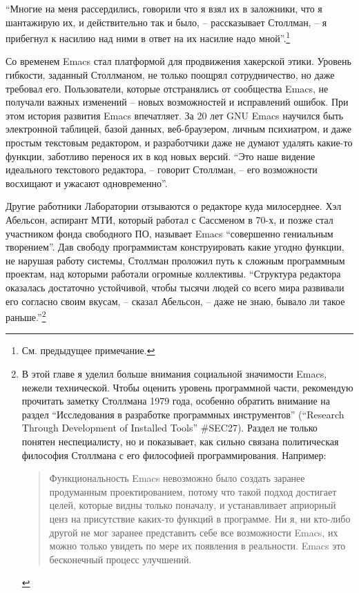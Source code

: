 \enquote{Многие на меня рассердились, говорили что я взял их в заложники, что я шантажирую их, и действительно так и было, -- рассказывает Столлман, -- я прибегнул к насилию над ними в ответ на их насилие надо мной}.\footnote{См. предыдущее примечание.}

Со временем Emacs стал платформой для продвижения хакерской этики. Уровень гибкости, заданный Столлманом, не только поощрял сотрудничество, но даже требовал его. Пользователи, которые отстранялись от сообщества Emacs, не получали важных изменений -- новых возможностей и исправлений ошибок. При этом история развития Emacs впечатляет. За 20 лет GNU Emacs научился быть электронной таблицей, базой данных, веб-браузером, личным психиатром, и даже простым текстовым редактором, и разработчики даже не думают удалять какие-то функции, заботливо перенося их в код новых версий. \enquote{Это наше видение идеального текстового редактора, -- говорит Столлман, -- его возможности восхищают и ужасают одновременно}.

Другие работники Лаборатории отзываются о редакторе куда милосерднее. Хэл Абельсон, аспирант МТИ, который работал с Сассменом в 70-х, и позже стал участником фонда свободного ПО, называет Emacs \enquote{совершенно гениальным творением}. Дав свободу программистам конструировать какие угодно функции, не нарушая работу системы, Столлман проложил путь к сложным программным проектам, над которыми работали огромные коллективы. \enquote{Структура редактора оказалась достаточно устойчивой, чтобы тысячи людей со всего мира развивали его согласно своим вкусам, -- сказал Абельсон, -- даже не знаю, бывало ли такое раньше.}\footnote{В этой главе я уделил больше внимания социальной значимости Emacs, нежели технической. Чтобы оценить уровень программной части, рекомендую прочитать заметку Столлмана 1979 года, особенно обратить внимание на раздел \enquote{Исследования в разработке программных инструментов} (\enquote{Research Through Development of Installed Tools} \#SEC27). Раздел не только понятен неспециалисту, но и показывает, как сильно связана политическая философия Столлмана с его философией программирования. Например:

\begin{quote}
Функциональность Emacs невозможно было создать заранее продуманным проектированием, потому что такой подход достигает целей, которые видны только поначалу, и устанавливает априорный ценз на присутствие каких-то функций в программе. Ни я, ни кто-либо другой не мог заранее представить себе все возможности Emacs, их можно только увидеть по мере их появления в реальности. Emacs это бесконечный процесс улучшений.
\end{quote}}

